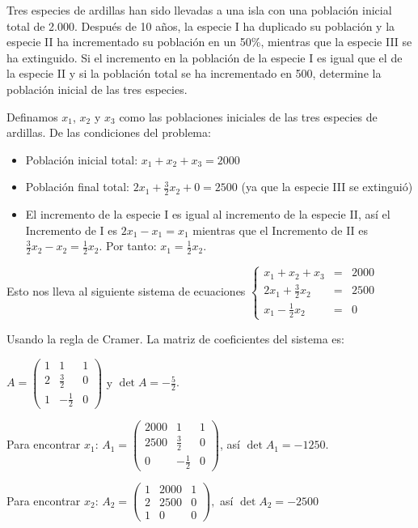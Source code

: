 \begin{prob} Tres especies de ardillas han sido llevadas a una isla con una población inicial total de 2.000. Después de 10 años, la especie I ha duplicado su población y la especie II ha incrementado su población en un 50\%, mientras que la especie III se ha extinguido. Si el incremento en la población de la especie I es igual que el de la especie II y si la población total se ha incrementado en 500, determine la población inicial de las tres especies.

\begin{myproof}
Definamos $x_1$, $x_2$ y $x_3$ como las poblaciones iniciales de las tres especies de ardillas. De las condiciones del problema:
\begin{itemize}
    \item Población inicial total: $x_1 + x_2 + x_3 = 2000$
    \item Población final total: $2x_1 + \frac{3}{2}x_2 + 0 = 2500$ (ya que la especie III se extinguió)
    \item El incremento de la especie I es igual al incremento de la especie II, así el Incremento de I es $2x_1 - x_1 = x_1$ mientras que el Incremento de II es $\frac{3}{2}x_2 - x_2 = \frac{1}{2}x_2.$ Por tanto: $x_1 = \frac{1}{2}x_2.$
\end{itemize}

Esto nos lleva al siguiente sistema de ecuaciones \(
\left\{
\begin{array}{rcl}
x_1 + x_2 + x_3 &=& 2000\\
2x_1 + \frac{3}{2}x_2 &=& 2500\\
x_1 - \frac{1}{2}x_2 &=& 0
\end{array}
\right.
\)

Usando la regla de Cramer. La matriz de coeficientes del sistema es:


\(
A = \begin{pmatrix}
1 & 1 & 1\\
2 & \frac{3}{2} & 0\\
1 & -\frac{1}{2} & 0
\end{pmatrix}
\)  y $\det A = -\frac{5}{2}.$

Para encontrar $x_1$: \(
A_1 = \begin{pmatrix}
2000 & 1 & 1\\
2500 & \frac{3}{2} & 0\\
0 & -\frac{1}{2} & 0
\end{pmatrix}
\), así \( \det A_1 = -1250 .\)

Para encontrar $x_2$: \(
A_2 = \begin{pmatrix}
1 & 2000 & 1\\
2 & 2500 & 0\\
1 & 0 & 0
\end{pmatrix}
,\) así \( \det A_2 = -2500 \)


\end{myproof}
\end{prob}
